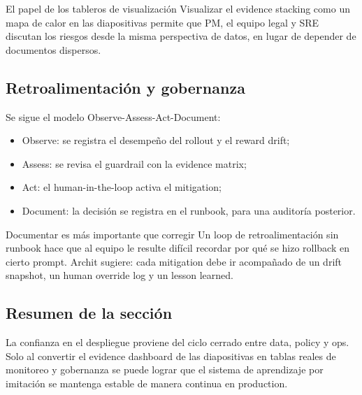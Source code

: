 \begin{importantbox}{El papel de los tableros de visualización}
Visualizar el evidence stacking como un mapa de calor en las diapositivas permite que PM, el equipo legal y SRE discutan los riesgos desde la misma perspectiva de datos, en lugar de depender de documentos dispersos.
\end{importantbox}

\subsection{Retroalimentación y gobernanza}

Se sigue el modelo Observe-Assess-Act-Document:
\begin{itemize}
    \item Observe: se registra el desempeño del rollout y el reward drift;
    \item Assess: se revisa el guardrail con la evidence matrix;
    \item Act: el human-in-the-loop activa el mitigation;
    \item Document: la decisión se registra en el runbook, para una auditoría posterior.
\end{itemize}

\begin{warningbox}{Documentar es más importante que corregir}
Un loop de retroalimentación sin runbook hace que al equipo le resulte difícil recordar por qué se hizo rollback en cierto prompt. Archit sugiere: cada mitigation debe ir acompañado de un drift snapshot, un human override log y un lesson learned.
\end{warningbox}

\subsection{Resumen de la sección}

La confianza en el despliegue proviene del ciclo cerrado entre data, policy y ops. Solo al convertir el evidence dashboard de las diapositivas en tablas reales de monitoreo y gobernanza se puede lograr que el sistema de aprendizaje por imitación se mantenga estable de manera continua en production.

